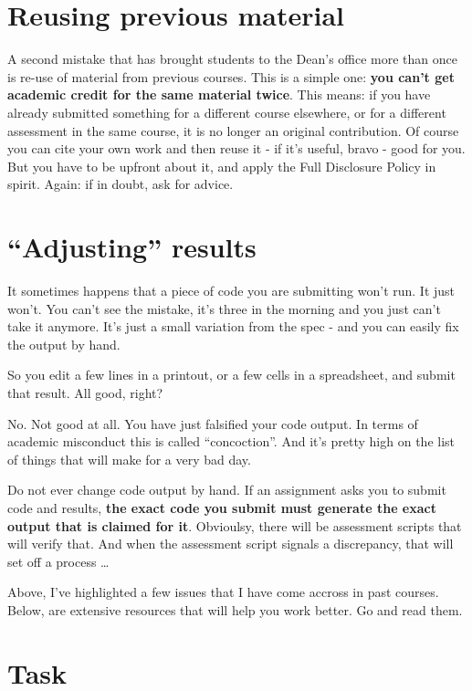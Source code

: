 \documentclass[]{book}
\begin{document}
\section{Reusing previous material}\label{reusing-previous-material}

A second mistake that has brought students to the Dean's office more
than once is re-use of material from previous courses. This is a simple
one: \textbf{you can't get academic credit for the same material twice}.
This means: if you have already submitted something for a different
course elsewhere, or for a different assessment in the same course, it
is no longer an original contribution. Of course you can cite your own
work and then reuse it - if it's useful, bravo - good for you. But you
have to be upfront about it, and apply the Full Disclosure Policy in
spirit. Again: if in doubt, ask for advice.

\section{\texorpdfstring{``Adjusting''
results}{Adjusting results}}\label{adjusting-results}

It sometimes happens that a piece of code you are submitting won't run.
It just won't. You can't see the mistake, it's three in the morning and
you just can't take it anymore. It's just a small variation from the
spec - and you can easily fix the output by hand.

So you edit a few lines in a printout, or a few cells in a spreadsheet,
and submit that result. All good, right?

No. Not good at all. You have just falsified your code output. In terms
of academic misconduct this is called ``concoction''. And it's pretty
high on the list of things that will make for a very bad day.

Do not ever change code output by hand. If an assignment asks you to
submit code and results, \textbf{the exact code you submit must generate
the exact output that is claimed for it}. Obvioulsy, there will be
assessment scripts that will verify that. And when the assessment script
signals a discrepancy, that will set off a process \ldots{}

Above, I've highlighted a few issues that I have come accross in past
courses. Below, are extensive resources that will help you work better.
Go and read them.

\section{Task}\label{task-2}
\end{document}
